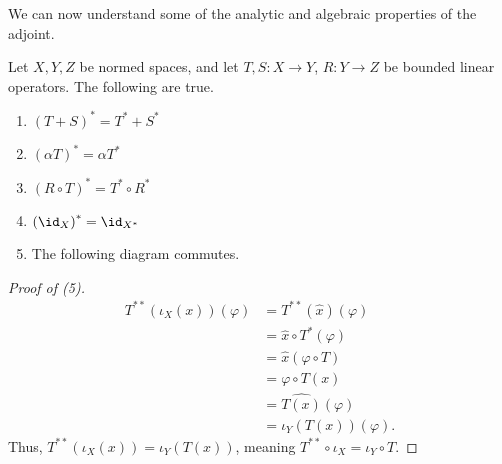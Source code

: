 \documentclass[10pt]{mypackage}
\begin{document}
We can now understand some of the analytic and algebraic properties of the adjoint.
\begin{theorem}
  Let $X,Y,Z$ be normed spaces, and let $T,S: X\rightarrow Y$, $R: Y\rightarrow Z$ be bounded linear operators. The following are true.
  \begin{enumerate}[(1)]
    \item $\left(T+S\right)^{\ast} = T^{\ast} + S^{\ast}$
    \item $\left(\alpha T\right)^{\ast} = \alpha T^{\ast}$
    \item $\left(R\circ T\right)^{\ast} = T^{\ast} \circ R^{\ast}$
    \item $\left(\id_{X}\right)^{\ast} = \id_{X^{\ast}}$
    \item The following diagram commutes.
      \begin{center}
      \end{center}
  \end{enumerate}
\end{theorem}
\begin{proof}[Proof of (5)]
  \begin{align*}
    T^{\ast\ast}\left(\iota_X\left(x\right)\right)\left(\varphi\right) &= T^{\ast\ast}\left(\hat{x}\right)\left(\varphi\right)\\
                                                                       &= \hat{x}\circ T^{\ast}\left(\varphi\right)\\
                                                                       &= \hat{x}\left(\varphi\circ T\right)\\
                                                                       &= \varphi\circ T\left(x\right)\\
                                                                       &= \widehat{T(x)}\left(\varphi\right)\\
                                                                       &= \iota_Y\left(T\left(x\right)\right)\left(\varphi\right).
  \end{align*}
  Thus, $T^{\ast\ast}\left(\iota_X(x)\right) = \iota_Y\left(T\left(x\right)\right)$, meaning $T^{\ast\ast}\circ \iota_X = \iota_Y\circ T$.
\end{proof}
\end{document}
